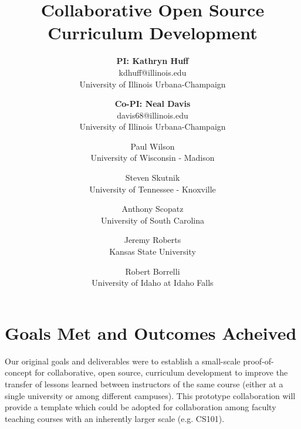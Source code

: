 \documentclass[11pt]{article}
\newcommand{\authorsite}{arfc.npre.illinois.edu}
\begin{document}
          \title{Collaborative Open Source Curriculum Development}
          \author{\textbf{PI: Kathryn Huff}\\
                  kdhuff@illinois.edu\\
                  University of Illinois Urbana-Champaign
                  \and
\textbf{Co-PI: Neal Davis}\\davis68@illinois.edu\\University of Illinois Urbana-Champaign
\and
Paul Wilson\\University of Wisconsin - Madison 
\and
          Steven Skutnik\\University of Tennessee - Knoxville
\and
          Anthony Scopatz\\University of South Carolina 
\and
          Jeremy Roberts\\Kansas State University 
\and
          Robert Borrelli\\University of Idaho at Idaho Falls
}
          \maketitle

          \pagestyle{fancy}
          \lhead{\textcolor{gray}{SIIP Close-Out Report}}
          \rhead{\textcolor{gray}{Collaborative Open Source Curriculum Development}}
          \renewcommand{\headrulewidth}{0pt}
          \renewcommand{\footrulewidth}{0pt}

          \section{Goals Met and Outcomes Acheived}
          Our original goals and deliverables were to establish a small-scale 
          proof-of-concept for collaborative, open source, curriculum 
          development to improve the transfer of lessons learned between 
          instructors of the same course (either at a single university or 
          among different campuses). This prototype collaboration will provide 
          a template which could be adopted for collaboration among faculty 
          teaching courses with an inherently larger scale (e.g.  CS101).
\end{document}
